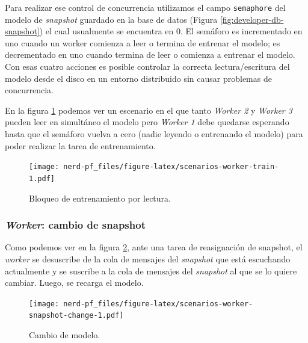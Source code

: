 \documentclass[12pt,a4paper,]{scrartcl}
\begin{document}
Para realizar ese control de concurrencia utilizamos el campo \texttt{semaphore} del modelo de \emph{snapshot} guardado en la base de datos (Figura \ref{fig:developer-db-snapshot}) el cual usualmente se encuentra en \(0\). El semáforo es incrementado en uno cuando un worker comienza a leer o termina de entrenar el modelo; es decrementado en uno cuando termina de leer o comienza a entrenar el modelo. Con esas cuatro acciones es posible controlar la correcta lectura/escritura del modelo desde el disco en un entorno distribuido sin causar problemas de concurrencia.

En la figura \ref{fig:scenarios-worker-train} podemos ver un escenario en el que tanto \emph{Worker 2} y \emph{Worker 3} pueden leer en simultáneo el modelo pero \emph{Worker 1} debe quedarse esperando hasta que el semáforo vuelva a cero (nadie leyendo o entrenando el modelo) para poder realizar la tarea de entrenamiento.

\begin{figure}[H]

{\centering \texttt{[image: nerd-pf\_files/figure-latex/scenarios-worker-train-1.pdf]} 

}

\caption{Bloqueo de entrenamiento por lectura.}\label{fig:scenarios-worker-train}
\end{figure}

\hypertarget{worker-cambio-de-snapshot}{%
\subsubsection{\texorpdfstring{\emph{Worker}: cambio de snapshot}{Worker: cambio de snapshot}}\label{worker-cambio-de-snapshot}}

Como podemos ver en la figura \ref{fig:scenarios-worker-snapshot-change}, ante una tarea de reasignación de snapshot, el \emph{worker} se desuscribe de la cola de mensajes del \emph{snapshot} que está escuchando actualmente y se suscribe a la cola de mensajes del \emph{snapshot} al que se lo quiere cambiar. Luego, se recarga el modelo.

\begin{figure}[H]

{\centering \texttt{[image: nerd-pf\_files/figure-latex/scenarios-worker-snapshot-change-1.pdf]} 

}

\caption{Cambio de modelo.}\label{fig:scenarios-worker-snapshot-change}
\end{figure}
\end{document}
